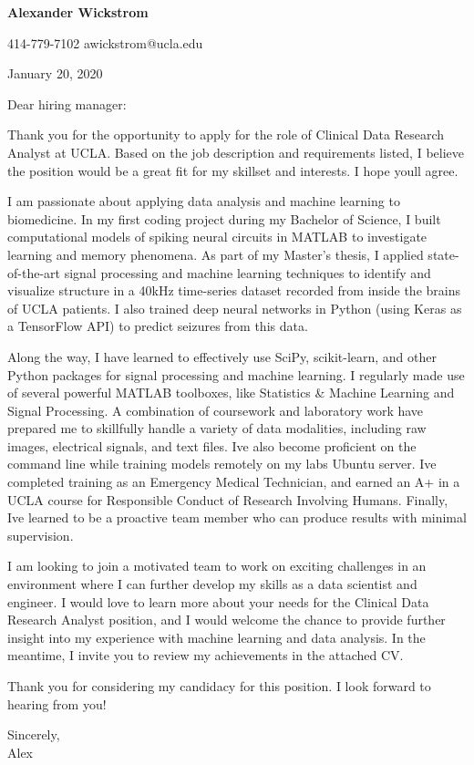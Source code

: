 \documentclass[10pt, oneside]{article}
\newcommand{\jobTitle}{Clinical Data Research Analyst }
\newcommand{\company}{UCLA}
\begin{document}
	


\centerline{\huge  \textbf{Alexander Wickstrom}}
        \vspace{1mm}
\centerline{ \faMobile{} 414-779-7102 \quad \faEnvelope{} awickstrom@ucla.edu }
January 20, 2020


Dear hiring manager:

Thank you for the opportunity to apply for the role of \jobTitle  at \company. Based on the job description and requirements listed, I believe the position would be a great fit for my skillset and interests. I hope you\textquotesingle ll agree.

I am passionate about applying data analysis and machine learning to biomedicine. In my first coding project during my Bachelor of Science, I built computational models of spiking neural circuits in MATLAB to investigate learning and memory phenomena. As part of my Master's thesis, I applied state-of-the-art signal processing and machine learning techniques to identify and visualize structure in a 40kHz time-series dataset recorded from inside the brains of UCLA patients. I also trained deep neural networks in Python (using Keras as a TensorFlow API) to predict seizures from this data.  

Along the way, I have learned to effectively use SciPy, scikit-learn, and other Python packages for signal processing and machine learning. I regularly made use of several powerful MATLAB toolboxes, like Statistics \& Machine Learning and Signal Processing. A combination of coursework and laboratory work have prepared me to skillfully handle a variety of data modalities, including raw images, electrical signals, and text files. I\textquotesingle ve also become proficient on the command line while training models remotely on my lab\textquotesingle s Ubuntu server. I\textquotesingle ve completed training as an Emergency Medical Technician, and earned an A+ in a UCLA course for Responsible Conduct of Research Involving Humans. Finally, I\textquotesingle ve learned to be a proactive team member who can produce results with minimal supervision. 

I am looking to join a motivated team to work on exciting challenges in an environment where I can further develop my skills as a data scientist and engineer. I would love to learn more about your needs for the \jobTitle position, and I would welcome the chance to provide further insight into my experience with machine learning and data analysis. In the meantime, I invite you to review my achievements in the attached CV. 

Thank you for considering my candidacy for this position. I look forward to hearing from you! 

Sincerely,\\
Alex
\end{document}

